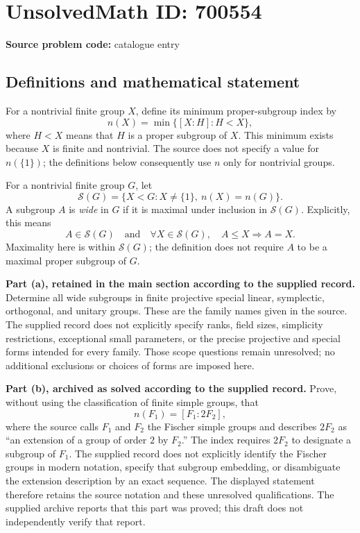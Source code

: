 \documentclass[11pt]{article}
\begin{document}
\section*{UnsolvedMath ID: 700554}
\textbf{Source problem code:} catalogue entry
\subsection{Definitions and mathematical statement}
For a nontrivial finite group \(X\), define its minimum proper-subgroup index by
\[
n(X)=\min\{[X:H]:H<X\},
\]
where \(H<X\) means that \(H\) is a proper subgroup of \(X\). This minimum exists because \(X\) is finite and nontrivial. The source does not specify a value for \(n(\{1\})\); the definitions below consequently use \(n\) only for nontrivial groups.

For a nontrivial finite group \(G\), let
\[
\mathcal S(G)=\{X<G:X\ne\{1\},\ n(X)=n(G)\}.
\]
A subgroup \(A\) is \emph{wide} in \(G\) if it is maximal under inclusion in \(\mathcal S(G)\). Explicitly, this means
\[
A\in\mathcal S(G)
\quad\text{and}\quad
\forall X\in\mathcal S(G),\quad A\le X\Longrightarrow A=X.
\]
Maximality here is within \(\mathcal S(G)\); the definition does not require \(A\) to be a maximal proper subgroup of \(G\).

\textbf{Part (a), retained in the main section according to the supplied record.} Determine all wide subgroups in finite projective special linear, symplectic, orthogonal, and unitary groups. These are the family names given in the source. The supplied record does not explicitly specify ranks, field sizes, simplicity restrictions, exceptional small parameters, or the precise projective and special forms intended for every family. Those scope questions remain unresolved; no additional exclusions or choices of forms are imposed here.

\textbf{Part (b), archived as solved according to the supplied record.} Prove, without using the classification of finite simple groups, that
\[
n(F_1)=[F_1:2F_2],
\]
where the source calls \(F_1\) and \(F_2\) the Fischer simple groups and describes \(2F_2\) as ``an extension of a group of order \(2\) by \(F_2\).'' The index requires \(2F_2\) to designate a subgroup of \(F_1\). The supplied record does not explicitly identify the Fischer groups in modern notation, specify that subgroup embedding, or disambiguate the extension description by an exact sequence. The displayed statement therefore retains the source notation and these unresolved qualifications. The supplied archive reports that this part was proved; this draft does not independently verify that report.
\end{document}
